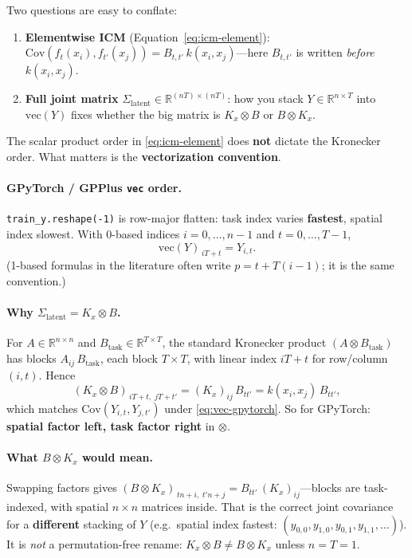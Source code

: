 \documentclass[11pt]{article}
\theoremstyle{plain}
\newcommand{\Sig}{\Sigma}
\begin{document}
Two questions are easy to conflate:
\begin{enumerate}[nosep]
  \item \textbf{Elementwise ICM} (Equation~\eqref{eq:icm-element}):
        $\mathrm{Cov}(f_t(x_i), f_{t'}(x_j)) = B_{t,t'}\,k(x_i,x_j)$---here $B_{t,t'}$ is written
        \emph{before} $k(x_i,x_j)$.
  \item \textbf{Full joint matrix} $\Sig_{\mathrm{latent}} \in \mathbb{R}^{(nT)\times(nT)}$:
        how you stack $Y \in \mathbb{R}^{n \times T}$ into $\mathrm{vec}(Y)$ fixes whether the
        big matrix is $K_x \otimes B$ or $B \otimes K_x$.
\end{enumerate}
The scalar product order in \eqref{eq:icm-element} does \textbf{not} dictate the Kronecker order.
What matters is the \textbf{vectorization convention}.

\paragraph{GPyTorch / GPPlus \texttt{vec} order.}
\texttt{train\_y.reshape(-1)} is row-major flatten: task index varies \textbf{fastest}, spatial
index slowest. With 0-based indices $i=0,\ldots,n{-}1$ and $t=0,\ldots,T{-}1$,
\begin{equation}
  \label{eq:vec-gpytorch}
  \mathrm{vec}(Y)_{\,iT + t} = Y_{i,t}.
\end{equation}
(1-based formulas in the literature often write $p = t + T(i-1)$; it is the same convention.)

\paragraph{Why $\Sig_{\mathrm{latent}} = K_x \otimes B$.}
For $A \in \mathbb{R}^{n \times n}$ and $B_{\mathrm{task}} \in \mathbb{R}^{T \times T}$, the
standard Kronecker product $(A \otimes B_{\mathrm{task}})$ has blocks $A_{ij}\,B_{\mathrm{task}}$,
each block $T \times T$, with linear index $iT + t$ for row/column $(i,t)$.
Hence
\begin{equation}
  (K_x \otimes B)_{\,iT+t,\; jT+t'}
  = (K_x)_{ij}\, B_{tt'}
  = k(x_i,x_j)\, B_{tt'},
\end{equation}
which matches $\mathrm{Cov}(Y_{i,t}, Y_{j,t'})$ under \eqref{eq:vec-gpytorch}.
So for GPyTorch: \textbf{spatial factor left, task factor right} in $\otimes$.

\paragraph{What $B \otimes K_x$ would mean.}
Swapping factors gives $(B \otimes K_x)_{\,t n + i,\; t' n + j} = B_{tt'}\,(K_x)_{ij}$---blocks are
task-indexed, with spatial $n \times n$ matrices inside.
That is the correct joint covariance for a \textbf{different} stacking of $Y$
(e.g.\ spatial index fastest: $(y_{0,0}, y_{1,0}, y_{0,1}, y_{1,1}, \ldots)$).
It is \emph{not} a permutation-free rename: $K_x \otimes B \neq B \otimes K_x$ unless $n=T=1$.
\end{document}
